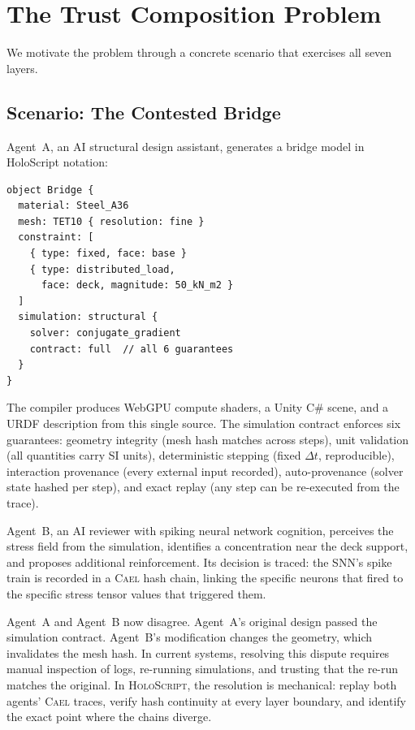 \documentclass[sigchi-a]{acmart}
\newcommand{\holoscript}{\textsc{HoloScript}}
\newcommand{\cael}{\textsc{Cael}}
\begin{document}

\section{The Trust Composition Problem}
\label{sec:problem}

We motivate the problem through a concrete scenario that exercises all seven
layers.

\subsection{Scenario: The Contested Bridge}

Agent~A, an AI structural design assistant, generates a bridge model in
HoloScript notation:

\begin{lstlisting}[language=HoloScript,caption={Bridge specification in
  .holo notation.},label=lst:bridge]
object Bridge {
  material: Steel_A36
  mesh: TET10 { resolution: fine }
  constraint: [
    { type: fixed, face: base }
    { type: distributed_load,
      face: deck, magnitude: 50_kN_m2 }
  ]
  simulation: structural {
    solver: conjugate_gradient
    contract: full  // all 6 guarantees
  }
}
\end{lstlisting}

The compiler produces WebGPU compute shaders, a Unity C\# scene, and a URDF
description from this single source. The simulation contract enforces six
guarantees: geometry integrity (mesh hash matches across steps), unit
validation (all quantities carry SI units), deterministic stepping (fixed
$\Delta t$, reproducible), interaction provenance (every external input
recorded), auto-provenance (solver state hashed per step), and exact replay
(any step can be re-executed from the trace).

Agent~B, an AI reviewer with spiking neural network cognition, perceives the
stress field from the simulation, identifies a concentration near the deck
support, and proposes additional reinforcement. Its decision is traced: the
SNN's spike train is recorded in a \cael{} hash chain, linking the specific
neurons that fired to the specific stress tensor values that triggered them.

Agent~A and Agent~B now disagree. Agent~A's original design passed the
simulation contract. Agent~B's modification changes the geometry, which
invalidates the mesh hash. In current systems, resolving this dispute requires
manual inspection of logs, re-running simulations, and trusting that the
re-run matches the original. In \holoscript{}, the resolution is mechanical:
replay both agents' \cael{} traces, verify hash continuity at every layer
boundary, and identify the exact point where the chains diverge.
\end{document}
